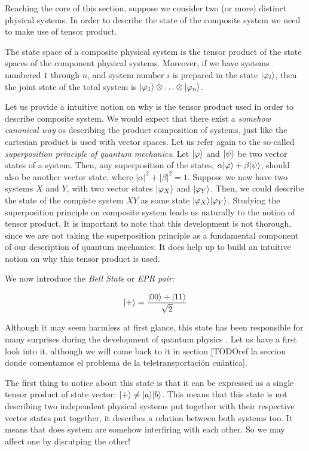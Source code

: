 Reaching the core of this section, suppose we consider two (or more) distinct physical systems. In order to describe the state of the composite system we need to make use of tensor product.

\begin{postulate}
	The state space of a composite physical system is the tensor product of the state spaces of the component physical systems. Moreover, if we have systems numbered $1$ through $n$, and system number $i$ is prepared in the state $|\varphi_i\rangle$, then the joint state of the total system is $|\varphi_1\rangle \otimes \dotsc \otimes |\varphi_n\rangle$.
\end{postulate}

Let us provide a intuitive notion on why is the tensor product used in order to describe composite system. We would expect that there exist a \emph{somehow canonical way} os describing the product composition of systems, just like the cartesian product is used with vector spaces. Let us refer again to the so-called \emph{superposition principle of quantum mechanics}. Let $|\varphi\rangle$ and $|\psi\rangle$ be two vector states of a system. Then, any superposition of the states, $\alpha|\varphi\rangle + \beta|\psi\rangle$, should also be another vector state, where $|\alpha|^2 + |\beta|^2 = 1$. Suppose we now have two systems $X$ and $Y$, with two vector states $|\varphi_X\rangle$ and $|\varphi_Y\rangle$. Then, we could describe the state of the compiste system $XY$ as some state $|\varphi_X\rangle|\varphi_Y\rangle$. Studying the superposition principle on composite system leads us naturally to the notion of tensor product. It is important to note that this development is not thorough, since we are not taking the superposition principle as a fundamental component of our description of quantum mechanics. It does help up to build an intuitive notion on why this tensor product is used.

We now introduce the \emph{Bell State} or \emph{EPR pair:}

$$ |+\rangle = \frac{ |00\rangle + |11\rangle }{ \sqrt 2 } $$

Although it may seem harmless at first glance, this state has been responsible for many surprises during the development of quantum physics \cite{Bellt1964}. Let us have a first look into it, although we will come back to it in section [TODOref la seccion donde comentamos el problema de la teletransportación cuántica].

The first thing to notice about this state is that it can be expressed as a single tensor product of state vector: $|+\rangle \neq |a\rangle|b\rangle$. This means that this state is not describing two independent physical systems put together with their respective vector states put together, it describes a relation between both systems too. It means that does system are somehow interfiring with each other. So we may affect one by disrutping the other!

